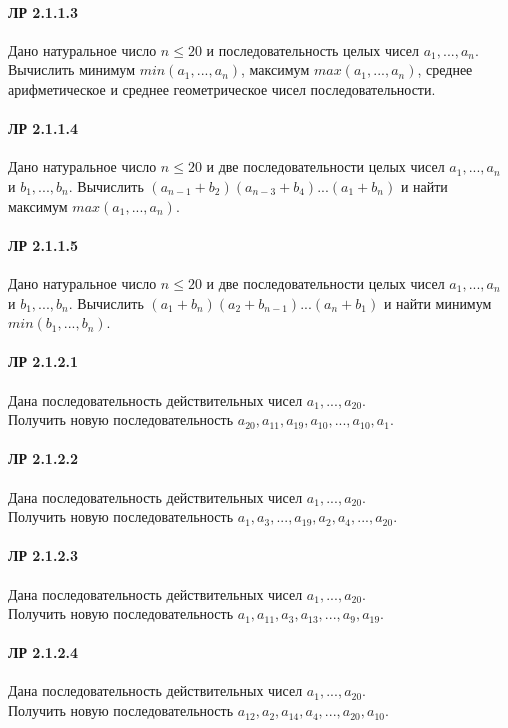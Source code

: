 \documentclass[12pt,a4paper]{report}
\begin{document}
\paragraph*{ЛР 2.1.1.3} Дано натуральное число $n \le 20$ и последовательность целых чисел $a_1, ..., a_n$. Вычислить минимум $min(a_1, ..., a_n)$, максимум $max(a_1, ..., a_n)$, среднее арифметическое и среднее геометрическое чисел последовательности.
\paragraph*{ЛР 2.1.1.4} Дано натуральное число $n \le 20$ и две последовательности целых чисел $a_1, ..., a_n$ и $b_1, ..., b_n$. Вычислить $(a_{n-1} + b_2)(a_{n-3} + b_4) ... (a_1 + b_{n})$ и найти максимум $max(a_1, ..., a_n)$. 
\paragraph*{ЛР 2.1.1.5} Дано натуральное число $n \le 20$ и две последовательности целых чисел $a_1, ..., a_n$ и $b_1, ..., b_n$. Вычислить $(a_1 + b_n)(a_2 + b_{n-1}) ... (a_n + b_1)$ и найти минимум $min(b_1, ..., b_n)$.

\paragraph*{ЛР 2.1.2.1} Дана последовательность действительных чисел $a_1, ..., a_{20}$. \\
Получить новую последовательность $a_{20}, a_{11}, a_{19}, a_{10}, ..., a_{10}, a_1$.
\paragraph*{ЛР 2.1.2.2} Дана последовательность действительных чисел $a_1, ..., a_{20}$. \\
Получить новую последовательность  $a_1, a_3, ..., a_{19}, a_2, a_4, ..., a_{20}$.
\paragraph*{ЛР 2.1.2.3} Дана последовательность действительных чисел $a_1, ..., a_{20}$. \\
Получить новую последовательность  $a_1, a_{11}, a_3, a_{13}, ..., a_9, a_{19}$.
\paragraph*{ЛР 2.1.2.4} Дана последовательность действительных чисел $a_1, ..., a_{20}$. \\
Получить новую последовательность  $a_{12}, a_2, a_{14}, a_4, ..., a_{20}, a_{10}$.
\end{document}
